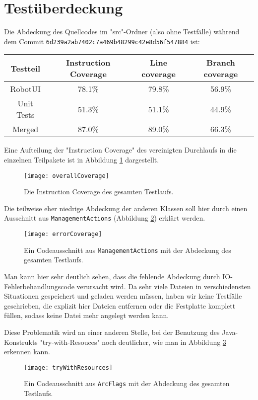 \documentclass[a4paper, 11pt]{article}
\newcommand{\code}[1]{\texttt{#1}}
\begin{document}
\section{Testüberdeckung}
Die Abdeckung des Quellcodes im "src"-Ordner (also ohne Testfälle) während dem Commit \code{6d239a2ab7402c7a469b48299c42e8d56f547884} ist:\\
\begin{longtable}{||c|c|c|c||}
Testteil & Instruction Coverage & Line coverage & Branch coverage\\ \hline\hline
RobotUI & 78.1\%&79.8\%&56.9\%\\ \hline
Unit Tests & 51.3\%&51.1\%&44.9\%\\ \hline \hline
Merged & 87.0\%&89.0\%&66.3\%\\ \hline
\end{longtable}

Eine Aufteilung der "Instruction Coverage" des vereinigten Durchlaufs in die einzelnen Teilpakete ist in Abbildung \ref{fig:overallCoverage} dargestellt.
\begin{figure}[h]
\texttt{[image: overallCoverage]}
\caption{Die Instruction Coverage des gesamten Testlaufs.}
\label{fig:overallCoverage}
\end{figure}

Die teilweise eher niedrige Abdeckung der anderen Klassen soll hier
durch einen Ausschnitt aus \code{ManagementActions} (Abbildung \ref{fig:errorCoverage}) erklärt werden.

\begin{figure}[h]
\texttt{[image: errorCoverage]}
\caption{Ein Codeausschnitt aus \code{ManagementActions} mit der Abdeckung des gesamten Testlaufs.}
\label{fig:errorCoverage}
\end{figure}

Man kann hier sehr deutlich sehen, dass die fehlende Abdeckung durch IO-Fehlerbehandlungscode verursacht wird. Da sehr viele Dateien in verschiedensten Situationen gespeichert und geladen werden müssen, haben wir keine Testfälle geschrieben, die explizit hier Dateien entfernen oder die Festplatte komplett füllen, sodass keine Datei mehr angelegt werden kann.

Diese Problematik wird an einer anderen Stelle, bei der Benutzung des Java-Konstrukts "try-with-Resouces" noch deutlicher, wie man in Abbildung \ref{fig:tryWithResources} erkennen kann.

\begin{figure}[H]
\texttt{[image: tryWithResources]}
\caption{Ein Codeausschnitt aus \code{ArcFlags} mit der Abdeckung des gesamten Testlaufs.}
\label{fig:tryWithResources}
\end{figure}
\end{document}
